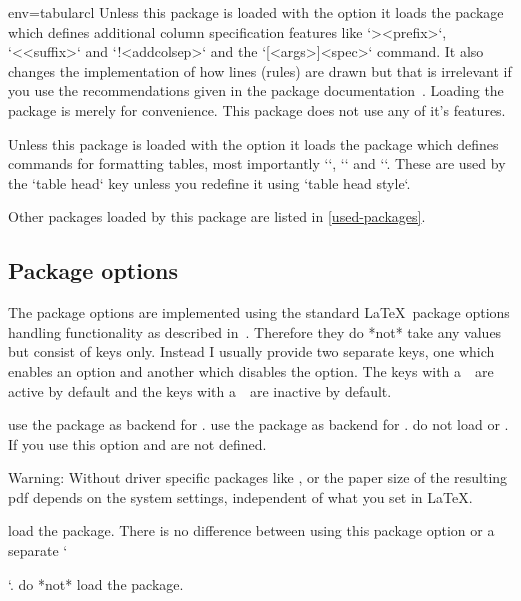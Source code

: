 \begin{tableobject}{env=tabular}{cl}
Unless this package is loaded with the  option
it loads the  package which defines additional column specification features like `>{<prefix>}`, `<{<suffix>}` and `!{<addcolsep>}`
and the `\newcolumntype{<col>}[<args>]{<spec>}` command.
It also changes the implementation of how lines (rules) are drawn
but that is irrelevant if you use the recommendations given in the  package documentation~\autocite[section~2 ]{booktabs}.
Loading the  package is merely for convenience. This package does not use any of it's features.

Unless this package is loaded with the  option
it loads the  package which defines commands for formatting tables, most importantly `\toprule`, `\midrule` and `\bottomrule`.
These are used by the `table head` key unless you redefine it using `table head style`.

Other packages loaded by this package are listed in \cref{used-packages}.


\subsection{Package options}
\label{package-options}

The package options are implemented using the standard \LaTeX\ package options handling functionality as described in~\autocite{clsguide}.
Therefore they do *not* take any values but consist of keys only.
Instead I usually provide two separate keys, one which enables an option and another which disables the option.
The keys with a~\radioon\ are active by default and the keys with a~\radiooff\ are inactive by default.

 use the  package as backend for .
 use the  package as backend for .
 do not load  or .
   If you use this option  and  are not defined.

   Warning: Without driver specific packages like ,  or  the paper size of the resulting pdf depends on the system settings, independent of what you set in \LaTeX. \autocite{texexchange_papersize}

 load the  package.
  There is no difference between using this package option or a separate `\usepackage{array}`.
 do *not* load the  package.


\end{tableobject}
